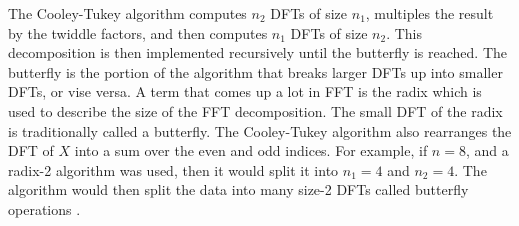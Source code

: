             The Cooley-Tukey algorithm computes $n_2$ DFTs of size $n_1$, multiples the
            result by the twiddle factors, and then computes $n_1$ DFTs of size
            $n_2$. This decomposition is then implemented recursively until the
            butterfly is reached. 
            The butterfly is the portion of the algorithm 
            that breaks larger DFTs up into smaller
            DFTs, or vise versa.
            A term that comes up a
            lot in FFT is the radix which is used to describe the size of the
            FFT decomposition.
            The small DFT of the radix is traditionally called a butterfly. The
            Cooley-Tukey algorithm also rearranges the DFT of $X$ into a sum over the even
            and odd indices.
            For example, if $n=8$, and a radix-2 algorithm was used, then it would split it
            into $n_1=4$ and $n_2=4$. The algorithm would then split the data into many
            size-2 DFTs called butterfly operations \cite{frigo2005design}.
%
%
%
